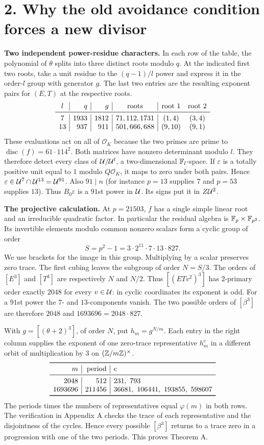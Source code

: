 \documentclass[11pt,a4paper,oneside,openany]{book}
\newcommand{\localhead}[1]{\needspace{5\baselineskip}\section*{\color{ink}#1}}
\let\sect\localhead\let\secx\localhead\let\head\localhead
\begin{document}
\sect{2. Why the old avoidance condition forces a new divisor}
\textbf{Two independent power-residue characters.} In each row of the table, the polynomial of $\theta$ splits into three distinct roots modulo $q$. At the indicated first two roots, take a unit residue to the $(q-1)/l$ power and express it in the order-$l$ group with generator $g$. The last two entries are the resulting exponent pairs for $(E,T)$ at the respective roots.
\[
\begin{array}{c|r|r|c|cc}
l&q&g&\text{roots}&\text{root 1}&\text{root 2}\\\midrule
7&1933&1812&71,112,1731&(1,4)&(3,4)\\
13&937&911&501,666,688&(9,10)&(9,1)
\end{array}
\]
These evaluations act on all of $\mathcal O_K$ because the two primes are prime to $\operatorname{disc}(f)=61\cdot114^2$. Both matrices have nonzero determinant modulo $l$. They therefore detect every class of $\mathcal U/\mathcal U^l$, a two-dimensional $\mathbb F_l$-space. If $\varepsilon$ is a totally positive unit equal to $1$ modulo $Q\mathcal O_K$, it maps to zero under both pairs. Hence $\varepsilon\in\mathcal U^7\cap\mathcal U^{13}=\mathcal U^{91}$. Also $91\mid n$ (for instance $p=13$ supplies $7$ and $p=53$ supplies $13$). Thus $B_0\varepsilon$ is a $91$st power in $\mathcal U$. Its signs put it in $Z\mathcal U^2$.

\textbf{The projective calculation.} At $p=21503$, $f$ has a single simple linear root and an irreducible quadratic factor. In particular the residual algebra is $\mathbb F_p\times\mathbb F_{p^2}$. Its invertible elements modulo common nonzero scalars form a cyclic group of order
\[
 S=p^2-1=3\cdot 2^{11}\cdot7\cdot13\cdot827 .
\]
We use brackets for the image in this group. Multiplying by a scalar preserves zero trace. The first cubing leaves the subgroup of order $N=S/3$. The orders of $[E^3]$ and $[T^3]$ are respectively $N$ and $N/2$. Thus $[(ETv^2)^3]$ has $2$-primary order exactly $2048$ for every $v\in\mathcal U$: in cyclic coordinates its exponent is odd. For a $91$st power the $7$- and $13$-components vanish. The two possible orders of $[\beta^3]$ are therefore $2048$ and $1693696=2048\cdot827$.

With $g=[(\theta+2)^3]$, of order $N$, put $h_m=g^{N/m}$. Each entry in the right column supplies the exponent of one zero-trace representative $h_m^e$ in a different orbit of multiplication by $3$ on $(\mathbb Z/m\mathbb Z)^\times$.
\[
\begin{array}{r|r|l}\toprule
m&\text{period}&e\\\midrule
2048&512&231,\ 793\\
1693696&211456&36681,\ 106441,\ 193855,\ 598607\\\bottomrule
\end{array}
\]
The periods times the numbers of representatives equal $\varphi(m)$ in both rows. The verification in Appendix A checks the trace of each representative and the disjointness of the cycles. Hence every possible $[\beta^3]$ returns to a trace zero in a progression with one of the two periods. This proves Theorem A.
\end{document}
